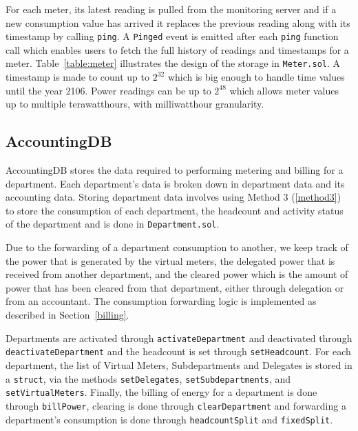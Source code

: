 For each meter, its latest reading is pulled from the monitoring server and if a new consumption value has arrived it replaces the previous reading along with its timestamp by calling \texttt{ping}. A \texttt{Pinged} event is emitted after each \texttt{ping} function call which enables users to fetch the full history of readings and timestamps for a meter. Table~\ref{table:meter} illustrates the design of the storage in \texttt{Meter.sol}. A timestamp is made to count up to $2^{32}$ which is big enough to handle time values until the year 2106. Power readings can be up to $2^{48}$ which allows meter values up to multiple terawatthours, with milliwatthour granularity.



\subsection{AccountingDB}

AccountingDB stores the data required to performing metering and billing for a department. Each department's data is broken down in department data and its accounting data. Storing department data involves using Method 3 (\ref{method3}) to store the consumption of each department, the headcount and activity status of the department and is done in \texttt{Department.sol}. 

Due to the forwarding of a department consumption to another, we keep track of the power that is generated by the virtual meters, the delegated power that is received from another department, and the cleared power which is the amount of power that has been cleared from that department, either through delegation or from an accountant. The consumption forwarding logic is implemented as described in Section~\ref{billing}. 

Departments are activated through \texttt{activateDepartment} and deactivated through \texttt{deactivateDepartment} and the headcount is set through \texttt{setHeadcount}. For each department, the list of Virtual Meters, Subdepartments and Delegates is stored in a \texttt{struct}, via the methods \texttt{setDelegates}, \texttt{setSubdepartments}, and \texttt{setVirtualMeters}. Finally, the billing of energy for a department is done through \texttt{billPower}, clearing is done through \texttt{clearDepartment} and forwarding a department's consumption is done through \texttt{headcountSplit} and \texttt{fixedSplit}.



